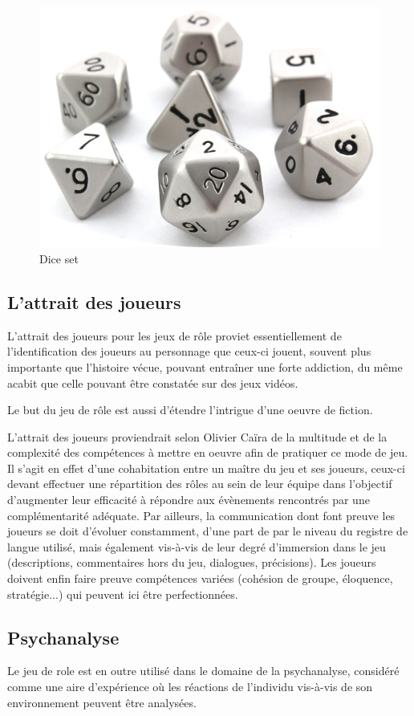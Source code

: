 \documentclass[a4paper,12pt,final,oneside]{article}
\begin{document}
\begin{figure}[h!]
    \centering
    \includegraphics[width=0.80\linewidth]{img/dice_set.png}
    \caption{Dice set}
\end{figure}

\subsection{L'attrait des joueurs}
L'attrait des joueurs pour les jeux de rôle proviet essentiellement de l'identification des joueurs au personnage que ceux-ci jouent, souvent plus importante que l'histoire vécue, pouvant entraîner une forte addiction, du même acabit que celle pouvant être constatée sur des jeux vidéos.

Le but du jeu de rôle est aussi d'étendre l'intrigue d'une oeuvre de fiction.

L'attrait des joueurs proviendrait selon Olivier Caïra\cite{caira2007jeux} de la multitude et de la complexité des compétences à mettre en oeuvre afin de pratiquer ce mode de jeu. Il s'agit en effet d'une cohabitation entre un maître du jeu et ses joueurs, ceux-ci devant effectuer une répartition des rôles au sein de leur équipe dans l'objectif d'augmenter leur efficacité à répondre aux évènements rencontrés par une complémentarité adéquate. Par ailleurs, la communication dont font preuve les joueurs se doit d'évoluer constamment, d'une part de par le niveau du registre de langue utilisé, mais également vis-à-vis de leur degré d'immersion dans le jeu (descriptions, commentaires hors du jeu, dialogues, précisions). Les joueurs doivent enfin faire preuve compétences variées (cohésion de groupe, éloquence, stratégie...) qui peuvent ici être perfectionnées.

\subsection{Psychanalyse}
Le jeu de role est en outre utilisé dans le domaine de la psychanalyse, considéré comme une aire d'expérience où les réactions de l'individu vis-à-vis de son environnement peuvent être analysées.
\end{document}
